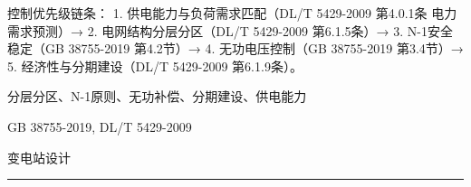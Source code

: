 \documentclass[12pt,a4paper]{ctexart}
\begin{document}
\begin{description}[leftmargin=1.5em,style=nextline,font=\normalfont]
控制优先级链条：
1. 供电能力与负荷需求匹配（DL/T 5429-2009 第4.0.1条 电力需求预测）→ 2. 电网结构分层分区（DL/T 5429-2009 第6.1.5条）→ 3. N-1安全稳定（GB 38755-2019 第4.2节）→ 4. 无功电压控制（GB 38755-2019 第3.4节）→ 5. 经济性与分期建设（DL/T 5429-2009 第6.1.9条）。
  \item[KW:] 分层分区、N-1原则、无功补偿、分期建设、供电能力
  \item[Std:] GB 38755-2019, DL/T 5429-2009
  \item[Topic:] 变电站设计
\end{description}
\vspace{4pt}
\hrule\vspace{6pt}
\end{document}

